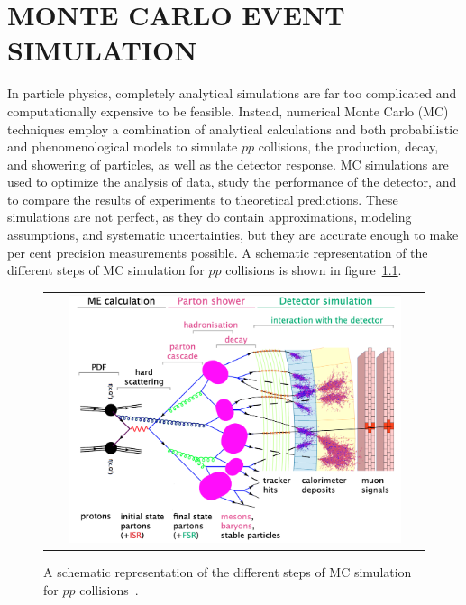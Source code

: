 
\chapter{MONTE CARLO EVENT SIMULATION}
\label{Monte_Carlo_Event_Simulation}
In particle physics, completely analytical simulations are far too complicated and computationally expensive to be feasible.
Instead, numerical Monte Carlo (MC) techniques employ a combination of analytical calculations and both probabilistic and phenomenological models to simulate $pp$ collisions, the production, decay, and showering of particles, as well as the detector response.
MC simulations are used to optimize the analysis of data, study the performance of the detector, and to compare the results of experiments to theoretical predictions.
These simulations are not perfect, as they do contain approximations, modeling assumptions, and systematic uncertainties, but they are accurate enough to make per cent precision measurements possible.
A schematic representation of the different steps of MC simulation for $pp$ collisions is shown in figure~\ref{MC_simulation}.
\begin{figure}[!htb]
  \begin{center}
    \begin{tabular}{c}
        \includegraphics[width=0.9\textwidth]{fig_Event_Simulation/MC_simulation.png}
    \end{tabular}
    \caption{A schematic representation of the different steps of MC simulation for $pp$ collisions~\cite{bartosik}.
            }
    \label{MC_simulation}
  \end{center}
\end{figure}

